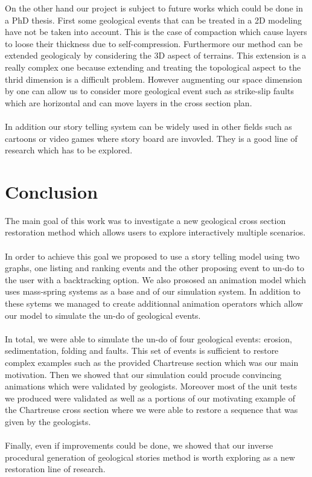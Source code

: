 \documentclass[12pt, a4paper]{report} %
\begin{document}
On the other hand our project is subject to future works which could be done in a PhD thesis. 
First some geological events that can be treated in a 2D modeling have not be taken into account. This is the case of compaction which cause layers to loose their thickness due to self-compression. Furthermore our method can be extended geologicaly by considering the 3D aspect of terrains. This extension is a really complex one because extending and treating the topological aspect to the thrid dimension is a difficult problem. However augmenting our space dimension by one can allow us to consider more geological event such as strike-slip faults which are horizontal and can move layers in the cross section plan. \\\\

In addition our story telling system can be widely used in other fields such as cartoons or video games where story board are invovled. They is a good line of research which has to be explored.
\chapter{Conclusion}
The main goal of this work was to investigate a new geological cross section restoration method which allows users to explore interactively multiple scenarios. \\\\
In order to achieve this goal we proposed to use a story telling model using two graphs, one listing and ranking events and the other proposing event to un-do to the user with a backtracking option. We  also prososed an animation model which uses mass-spring systems as a base and of our simulation system. In addition to these sytems we managed to create additionnal animation operators which allow our model to simulate the un-do of geological events.\\\\ In total, we were able to simulate the un-do of four geological events: erosion, sedimentation, folding and faults. This set of events is sufficient to restore complex examples such as the provided Chartreuse section which was our main motivation.
 Then we showed that our simulation could procude convincing animations which were validated by geologists. Moreover most of the unit tests we produced were validated as well as a portions of our motivating example of the Chartreuse cross section where we were able to restore a sequence that was given by the geologists.\\\\
 Finally, even if improvements could be done, we showed that our inverse procedural generation of geological stories method is worth exploring as a new restoration line of research.
\end{document}
